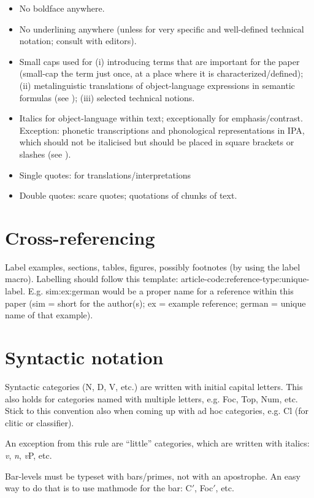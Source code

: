 \begin{itemize}
    \item No boldface anywhere.
    \item No underlining anywhere (unless for very specific and well-defined technical notation; consult with editors).
    \item Small caps used for (i) introducing terms that are important for the paper (small-cap the term just once, at a place where it is characterized/defined); (ii) metalinguistic translations of object-language expressions in semantic formulas (see ); (iii) selected technical notions.
    \item Italics for object-language within text; exceptionally for emphasis/contrast. Exception: phonetic transcriptions and phonological representations in IPA, which should not be italicised but should be placed in square brackets or slashes (see ).
    \item Single quotes: for translations/interpretations
    \item Double quotes: scare quotes; quotations of chunks of text.
\end{itemize}

\section{Cross-referencing}

Label examples, sections, tables, figures, possibly footnotes (by using the label macro). Labelling should follow this template: article-code:reference-type:unique-label. E.g. sim:ex:german would be a proper name for a reference within this paper (sim = short for the author(s); ex = example reference; german = unique name of that example).

\section{Syntactic notation}

Syntactic categories (N, D, V, etc.) are written with initial capital letters. This also holds for categories named with multiple letters, e.g. Foc, Top, Num, etc. Stick to this convention also when coming up with ad hoc categories, e.g. Cl (for clitic or classifier).

An exception from this rule are ``little'' categories, which are written with italics: \textit{v}, \textit{n}, \textit{v}P, etc.

Bar-levels must be typeset with bars/primes, not with an apostrophe. An easy way to do that is to use mathmode for the bar: C$'$, Foc$'$, etc.

